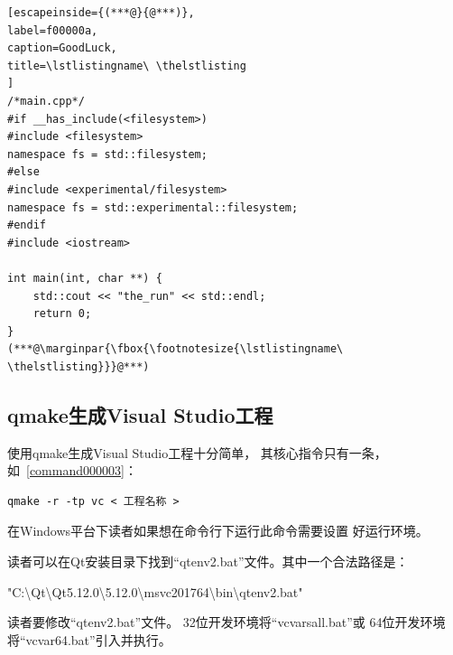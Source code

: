 \FloatBarrier
\begin{lstlisting}[escapeinside={(***@}{@***)},
label=f00000a,
caption=GoodLuck,
title=\lstlistingname\ \thelstlisting
]
/*main.cpp*/
#if __has_include(<filesystem>)
#include <filesystem>
namespace fs = std::filesystem;
#else
#include <experimental/filesystem>
namespace fs = std::experimental::filesystem;
#endif
#include <iostream>

int main(int, char **) {
    std::cout << "the_run" << std::endl;
    return 0;
}
(***@\marginpar{\fbox{\footnotesize{\lstlistingname\ \thelstlisting}}}@***)\end{lstlisting}          %


\FloatBarrier
\subsection{
qmake生成Visual Studio工程
}\label{ss000910}

使用qmake生成Visual Studio工程十分简单，
其核心指令只有一条，
如\commandnumbernameone\ \ref{command000003}：

\FloatBarrier
{}\label{command000003}    %
\begin{lstlisting}[caption=GoodLuck,
title=\commandnumbernameone\ \thecommandnumber
]
qmake -r -tp vc < 工程名称 >
\end{lstlisting}          %
\marginpar{\raisebox{1.65ex}{\fbox{\footnotesize{\commandnumbernameone\ \thecommandnumber}}}} %


在Windows平台下读者如果想在命令行下运行此命令需要设置
好运行环境。


读者可以在Qt安装目录下找到“qtenv2.bat”文件。其中一个合法路径是：
\begin{littlelongworld}
"C:\textbackslash{}Qt\textbackslash{}Qt5.12.0\textbackslash{}5.12.0\textbackslash{}msvc2017\underline{\hspace{0.5em}}64\textbackslash{}bin\textbackslash{}qtenv2.bat"
\end{littlelongworld}

读者要修改“qtenv2.bat”文件。
32位开发环境将“vcvarsall.bat”或
64位开发环境将“vcvar64.bat”引入并执行。

